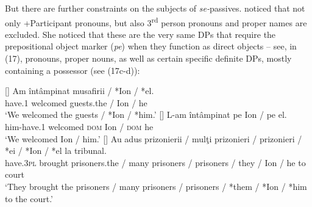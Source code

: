 \documentclass[output=paper]{langsci/langscibook}
\begin{document}
But there are further constraints on the subjects of \textit{se-}passives. \citet{Cornilescu1998} noticed that not only +Participant pronouns, but also 3\textsuperscript{rd} person pronouns and proper names are excluded. She noticed that these are the very same DPs that require the prepositional object marker (\textit{pe}) when they function as direct objects – see, in (17), pronouns, proper nouns, as well as certain specific definite DPs, mostly containing a possessor (see (17c-d)):

\ea%
    \label{ex:giurgea:17}
    \begin{xlista}[c{'}{'}.]
    []{
    \gll Am     întâmpinat musafirii / *Ion / *el.\\
         have.\textsc{1} welcomed guests.the / Ion / he   \\
    \glt ‘We welcomed  the guests / *Ion / *him.’}
    []{
    \gll L-am          întâmpinat pe   Ion  / pe    el. \\
                him-have.\textsc{1} welcomed \textsc{dom} Ion / \textsc{dom} he\\
    \glt        ‘We welcomed  Ion / him.’}
    []{
    \gll Au          adus     prizonierii    / mulţi prizonieri  / prizonieri / *ei / *Ion / *el la tribunal.\\
         have.\textsc{3pl} brought prisoners.the / many prisoners / prisoners / they / Ion / he    to court\\
    \glt ‘They brought the prisoners / many prisoners / prisoners / *them / *Ion / *him to the court.’}

\end{xlista}
\end{document}
